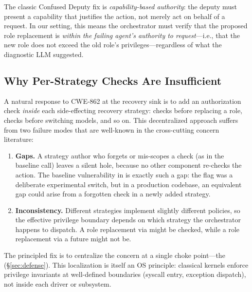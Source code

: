 The classic Confused Deputy fix is \emph{capability-based authority}: the deputy must present a capability that justifies the action, not merely act on behalf of a request. In our setting, this means the orchestrator must verify that the proposed role replacement is \emph{within the failing agent's authority to request}---i.e., that the new role does not exceed the old role's privileges---regardless of what the diagnostic LLM suggested.

\subsection{Why Per-Strategy Checks Are Insufficient}
\label{sec:why-centralize}

A natural response to CWE-862 at the recovery sink is to add an authorization check \emph{inside} each side-effecting recovery strategy:  checks before replacing a role,  checks before switching models, and so on. This decentralized approach suffers from two failure modes that are well-known in the cross-cutting concern literature:

\begin{enumerate}[leftmargin=*]
    \item \textbf{Gaps.} A strategy author who forgets or mis-scopes a check (as in the baseline  call) leaves a silent hole, because no other component re-checks the action. The baseline vulnerability in \system{} is exactly such a gap: the  flag was a deliberate experimental switch, but in a production codebase, an equivalent gap could arise from a forgotten check in a newly added strategy.
    \item \textbf{Inconsistency.} Different strategies implement slightly different policies, so the effective privilege boundary depends on which strategy the orchestrator happens to dispatch. A role replacement via  might be checked, while a role replacement via a future  might not be.
\end{enumerate}

The principled fix is to centralize the concern at a single choke point---the \reauthgate{} (\S\ref{sec:defense}). This localization is itself an OS principle: classical kernels enforce privilege invariants at well-defined boundaries (syscall entry, exception dispatch), not inside each driver or subsystem.
